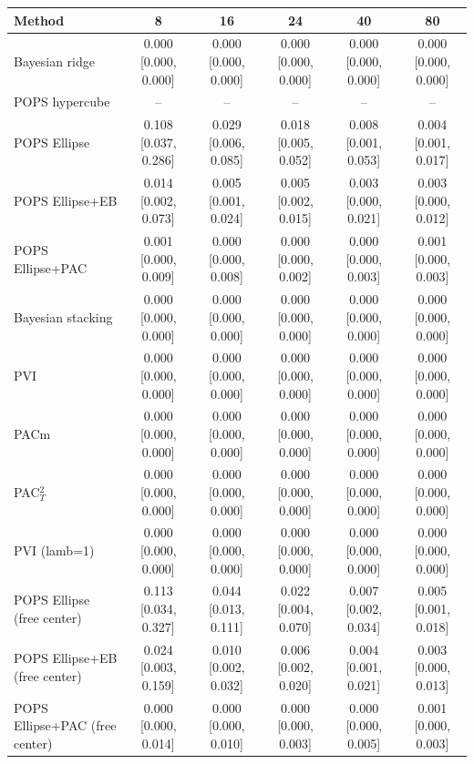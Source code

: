 \begin{tabular}{lccccc}
\toprule
Method & 8 & 16 & 24 & 40 & 80 \\
\midrule
Bayesian ridge & 0.000 {\scriptsize[0.000, 0.000]} & 0.000 {\scriptsize[0.000, 0.000]} & 0.000 {\scriptsize[0.000, 0.000]} & 0.000 {\scriptsize[0.000, 0.000]} & 0.000 {\scriptsize[0.000, 0.000]} \\
POPS hypercube & -- & -- & -- & -- & -- \\
POPS Ellipse & 0.108 {\scriptsize[0.037, 0.286]} & 0.029 {\scriptsize[0.006, 0.085]} & 0.018 {\scriptsize[0.005, 0.052]} & 0.008 {\scriptsize[0.001, 0.053]} & 0.004 {\scriptsize[0.001, 0.017]} \\
POPS Ellipse+EB & 0.014 {\scriptsize[0.002, 0.073]} & 0.005 {\scriptsize[0.001, 0.024]} & 0.005 {\scriptsize[0.002, 0.015]} & 0.003 {\scriptsize[0.000, 0.021]} & 0.003 {\scriptsize[0.000, 0.012]} \\
POPS Ellipse+PAC & 0.001 {\scriptsize[0.000, 0.009]} & 0.000 {\scriptsize[0.000, 0.008]} & 0.000 {\scriptsize[0.000, 0.002]} & 0.000 {\scriptsize[0.000, 0.003]} & 0.001 {\scriptsize[0.000, 0.003]} \\
Bayesian stacking & 0.000 {\scriptsize[0.000, 0.000]} & 0.000 {\scriptsize[0.000, 0.000]} & 0.000 {\scriptsize[0.000, 0.000]} & 0.000 {\scriptsize[0.000, 0.000]} & 0.000 {\scriptsize[0.000, 0.000]} \\
PVI & 0.000 {\scriptsize[0.000, 0.000]} & 0.000 {\scriptsize[0.000, 0.000]} & 0.000 {\scriptsize[0.000, 0.000]} & 0.000 {\scriptsize[0.000, 0.000]} & 0.000 {\scriptsize[0.000, 0.000]} \\
PACm & 0.000 {\scriptsize[0.000, 0.000]} & 0.000 {\scriptsize[0.000, 0.000]} & 0.000 {\scriptsize[0.000, 0.000]} & 0.000 {\scriptsize[0.000, 0.000]} & 0.000 {\scriptsize[0.000, 0.000]} \\
PAC$^2_T$ & 0.000 {\scriptsize[0.000, 0.000]} & 0.000 {\scriptsize[0.000, 0.000]} & 0.000 {\scriptsize[0.000, 0.000]} & 0.000 {\scriptsize[0.000, 0.000]} & 0.000 {\scriptsize[0.000, 0.000]} \\
PVI (lamb=1) & 0.000 {\scriptsize[0.000, 0.000]} & 0.000 {\scriptsize[0.000, 0.000]} & 0.000 {\scriptsize[0.000, 0.000]} & 0.000 {\scriptsize[0.000, 0.000]} & 0.000 {\scriptsize[0.000, 0.000]} \\
POPS Ellipse (free center) & 0.113 {\scriptsize[0.034, 0.327]} & 0.044 {\scriptsize[0.013, 0.111]} & 0.022 {\scriptsize[0.004, 0.070]} & 0.007 {\scriptsize[0.002, 0.034]} & 0.005 {\scriptsize[0.001, 0.018]} \\
POPS Ellipse+EB (free center) & 0.024 {\scriptsize[0.003, 0.159]} & 0.010 {\scriptsize[0.002, 0.032]} & 0.006 {\scriptsize[0.002, 0.020]} & 0.004 {\scriptsize[0.001, 0.021]} & 0.003 {\scriptsize[0.000, 0.013]} \\
POPS Ellipse+PAC (free center) & 0.000 {\scriptsize[0.000, 0.014]} & 0.000 {\scriptsize[0.000, 0.010]} & 0.000 {\scriptsize[0.000, 0.003]} & 0.000 {\scriptsize[0.000, 0.005]} & 0.001 {\scriptsize[0.000, 0.003]} \\
\bottomrule
\end{tabular}

